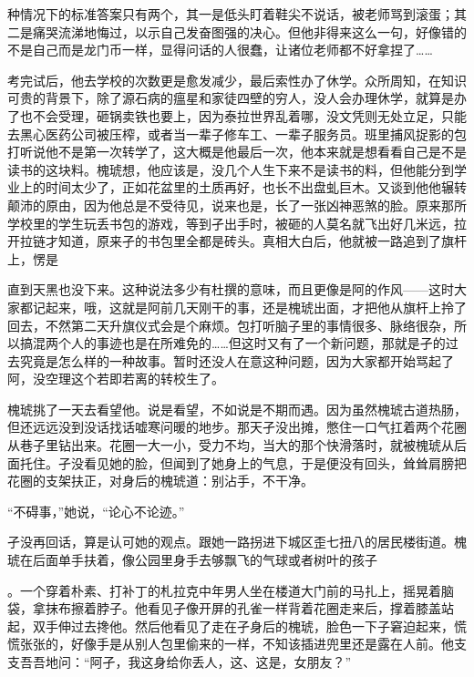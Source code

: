 \documentclass{article}
\begin{document}
\newpage 

种情况下的标准答案只有两个，其一是低头盯着鞋尖不说话，被老师骂到滚蛋；其二是痛哭流涕地悔过，以示自己发奋图强的决心。但他非得来这么一句，好像错的不是自己而是龙门币一样，显得问话的人很蠢，让诸位老师都不好拿捏了……

考完试后，他去学校的次数更是愈发减少，最后索性办了休学。众所周知，在知识可贵的背景下，除了源石病的瘟星和家徒四壁的穷人，没人会办理休学，就算是办了也不会受理，砸锅卖铁也要上，因为泰拉世界乱着哪，没文凭则无处立足，只能去黑心医药公司被压榨，或者当一辈子修车工、一辈子服务员。班里捕风捉影的包打听说他不是第一次转学了，这大概是他最后一次，他本来就是想看看自己是不是读书的这块料。槐琥想，他应该是，没几个人生下来不是读书的料，但他能分到学业上的时间太少了，正如花盆里的土质再好，也长不出盘虬巨木。又谈到他他辗转颠沛的原由，因为他总是不受待见，说来也是，长了一张凶神恶煞的脸。原来那所学校里的学生玩丢书包的游戏，等到孑出手时，被砸的人莫名就飞出好几米远，拉开拉链才知道，原来孑的书包里全都是砖头。真相大白后，他就被一路追到了旗杆上，愣是

\newpage 

直到天黑也没下来。这种说法多少有杜撰的意味，而且更像是阿的作风——这时大家都记起来，哦，这就是阿前几天刚干的事，还是槐琥出面，才把他从旗杆上拎了回去，不然第二天升旗仪式会是个麻烦。包打听脑子里的事情很多、脉络很杂，所以搞混两个人的事迹也是在所难免的……但这时又有了一个新问题，那就是孑的过去究竟是怎么样的一种故事。暂时还没人在意这种问题，因为大家都开始骂起了阿，没空理这个若即若离的转校生了。

槐琥挑了一天去看望他。说是看望，不如说是不期而遇。因为虽然槐琥古道热肠，但还远远没到没话找话嘘寒问暖的地步。那天孑没出摊，憋住一口气扛着两个花圈从巷子里钻出来。花圈一大一小，受力不均，当大的那个快滑落时，就被槐琥从后面托住。孑没看见她的脸，但闻到了她身上的气息，于是便没有回头，耸耸肩膀把花圈的支架扶正，对身后的槐琥道：别沾手，不干净。

“不碍事，”她说，“论心不论迹。”

孑没再回话，算是认可她的观点。跟她一路拐进下城区歪七扭八的居民楼街道。槐琥在后面单手扶着，像公园里身手去够飘飞的气球或者树叶的孩子

\newpage 

。一个穿着朴素、打补丁的札拉克中年男人坐在楼道大门前的马扎上，摇晃着脑袋，拿抹布擦着脖子。他看见孑像开屏的孔雀一样背着花圈走来后，撑着膝盖站起，双手伸过去搀他。然后他看见了走在孑身后的槐琥，脸色一下子窘迫起来，慌慌张张的，好像手是从别人包里偷来的一样，不知该插进兜里还是露在人前。他支支吾吾地问：“阿孑，我这身给你丢人，这、这是，女朋友？”
\end{document}
